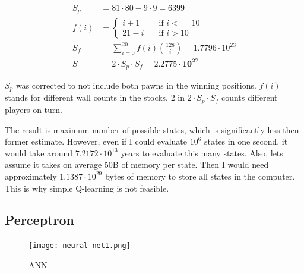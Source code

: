\documentclass[12pt, oneside]{book}
\begin{document}
    \begin{figure}
      \vspace*{-1.70cm}
      \begin{equation}
        \label{eqn:correctsp}
        \begin{aligned}
          S_p &= 81 {\cdot} 80 - 9 {\cdot} 9 = 6399
          \\
          f(i)&= \begin{cases}
            i + 1  & \quad \text{if } i <= 10 \\
            21 - i & \quad \text{if } i > 10
          \end{cases} \\
          S_f &= \sum_{i=0}^{20} f(i){128 \choose i} = 1.7796 {\cdot} 10^{23}
          \\
          S &= 2 {\cdot} S_p {\cdot} S_f = \mathbf{2.2775 {\cdot} 10^{27}}
        \end{aligned}
      \end{equation}
      \vspace*{-1.30cm}
    \end{figure}
    $S_p$ was corrected to not include both pawns in the winning positions.
    $f(i)$ %
    stands for different wall counts in the stocks.
    $2$ in $2{\cdot} S_p {\cdot} S_f$ counts different players on turn.

    The result is maximum number of possible states, which is significantly
    less then former estimate. However, even if I could evaluate $10^{6}$
    states in one second, it would take around $7.2172{\cdot}10^{13}$ years to
    evaluate this many states. Also, lets assume it takes on average 50B
    of memory per state. Then I would need approximately
    $1.1387{\cdot}10^{29}$ bytes of memory to store all states in the
    computer. This is why simple Q-learning is not feasible.

  \subsection{Perceptron}

    \begin{figure}
      \vspace*{-0.45cm}
      \centering
      \texttt{[image: neural-net1.png]}
      \vspace*{-1.45cm}
      \caption{ANN}
      \label{fig:network}
      \vspace*{-1.00cm}
    \end{figure}
\end{document}

